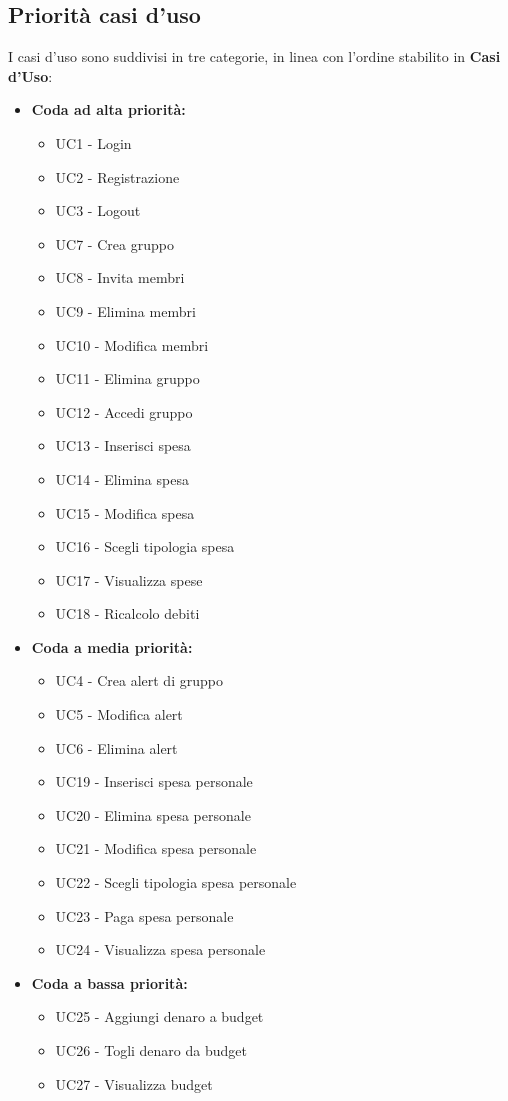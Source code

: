 \subsection{Priorità casi d'uso}
I casi d'uso sono suddivisi in tre categorie, in linea con l'ordine stabilito in \textbf{Casi d'Uso}:

\begin{itemize}
    \item \textbf{Coda ad alta priorità:} 
    \begin{itemize}
        \item UC1 - Login
        \item UC2 - Registrazione
        \item UC3 - Logout
        \item UC7 - Crea gruppo
        \item UC8 - Invita membri
        \item UC9 - Elimina membri
        \item UC10 - Modifica membri
        \item UC11 - Elimina gruppo
        \item UC12 - Accedi gruppo
        \item UC13 - Inserisci spesa
        \item UC14 - Elimina spesa
        \item UC15 - Modifica spesa
        \item UC16 - Scegli tipologia spesa
        \item UC17 - Visualizza spese
        \item UC18 - Ricalcolo debiti
    \end{itemize}
    
    \item \textbf{Coda a media priorità:} 
    \begin{itemize}
        \item UC4 - Crea alert di gruppo
        \item UC5 - Modifica alert
        \item UC6 - Elimina alert
        \item UC19 - Inserisci spesa personale
        \item UC20 - Elimina spesa personale
        \item UC21 - Modifica spesa personale
        \item UC22 - Scegli tipologia spesa personale
        \item UC23 - Paga spesa personale
        \item UC24 - Visualizza spesa personale
    \end{itemize}
    
    \item \textbf{Coda a bassa priorità:} 
    \begin{itemize}
        \item UC25 - Aggiungi denaro a budget
        \item UC26 - Togli denaro da budget
        \item UC27 - Visualizza budget
    \end{itemize}
\end{itemize}

